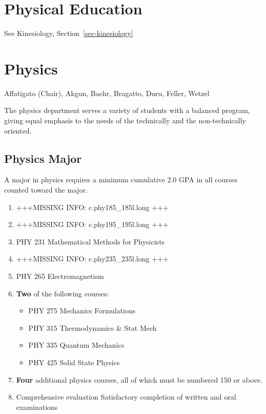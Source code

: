 \documentclass[
  letterpaper,
]{scrbook}
\providecommand{\tightlist}{%
  \setlength{\itemsep}{0pt}\setlength{\parskip}{0pt}}
\begin{document}
\section{Physical Education}\label{physical-education}

See Kinesiology, Section~\ref{sec-kinesiology}

\section{Physics}\label{physics}

Affatigato (Chair), Akgun, Baehr, Bragatto, Duru, Feller, Wetzel

The physics department serves a variety of students with a balanced
program, giving equal emphasis to the needs of the technically and the
non-technically oriented.

\subsection{Physics Major}\label{physics-major}

A major in physics requires a minimum cumulative 2.0 GPA in all courses
counted toward the major.

\begin{enumerate}
\def\labelenumi{\arabic{enumi}.}
\item
  +++MISSING INFO: c.phy185\_185l.long +++
\item
  +++MISSING INFO: c.phy195\_195l.long +++
\item
  PHY 231 Mathematical Methods for Physicists
\item
  +++MISSING INFO: c.phy235\_235l.long +++
\item
  PHY 265 Electromagnetism
\item
  \textbf{Two} of the following courses:

  \begin{itemize}
  \tightlist
  \item
    PHY 275 Mechanics Formulations
  \item
    PHY 315 Thermodynamics \& Stat Mech
  \item
    PHY 335 Quantum Mechanics
  \item
    PHY 425 Solid State Physics
  \end{itemize}
\item
  \textbf{Four} additional physics courses, all of which must be
  numbered 150 or above.
\item
  Comprehensive evaluation Satisfactory completion of written and oral
  examinations
\end{enumerate}
\end{document}
